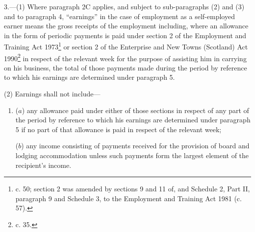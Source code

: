 \documentclass[12pt,a4paper]{article}
\begin{document}

\medskip

3.—(1) 
Where paragraph 2C applies, and subject  %
to sub-paragraphs (2) and (3) and to paragraph 4, “earnings” in the case of employment as a self-employed earner means the gross receipts of the employment including, where an allowance in the form of periodic payments is paid under section 2 of the Employment and Training Act 1973\footnote{ c. 50; section 2 was amended by sections 9 and 11 of, and Schedule 2, Part II, paragraph 9 and Schedule 3, to the Employment and Training Act 1981 (c. 57).} or section 2 of the Enterprise and New Towns (Scotland) Act 1990\footnote{ c. 35.} in respect of the relevant week for the purpose of assisting him in carrying on his business, the total of those payments made during the period by reference to which his earnings are determined under paragraph 5.

(2) Earnings shall not include—
\begin{enumerate}\item[]
($a$) any allowance paid under either of those sections in respect of any part of the period by reference to which his earnings are determined under paragraph 5 if no part of that allowance is paid in respect of the relevant week;

($b$) any income consisting of payments received for the provision of board and lodging accommodation unless such payments form the largest element of the recipient’s income.
\end{enumerate}
\end{document}
